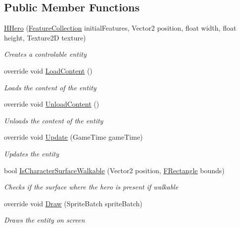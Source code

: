 \subsection*{Public Member Functions}
\begin{DoxyCompactItemize}
\item 
\hyperlink{class_hel_project_1_1_game_world_1_1_entities_1_1_h_hero_aad688c29121213e9b3790baa5f26890f}{H\+Hero} (\hyperlink{class_hel_project_1_1_features_1_1_feature_collection}{Feature\+Collection} initial\+Features, Vector2 position, float width, float height, Texture2\+D texture)
\begin{DoxyCompactList}\small\item\em Creates a controlable entity \end{DoxyCompactList}\item 
override void \hyperlink{class_hel_project_1_1_game_world_1_1_entities_1_1_h_hero_a8b69c5d3b4e7c68b2472de1d3bf76618}{Load\+Content} ()
\begin{DoxyCompactList}\small\item\em Loads the content of the entity \end{DoxyCompactList}\item 
override void \hyperlink{class_hel_project_1_1_game_world_1_1_entities_1_1_h_hero_a2e665a9cc2a0fea82c4ac7c8b1f3468b}{Unload\+Content} ()
\begin{DoxyCompactList}\small\item\em Unloads the content of the entity \end{DoxyCompactList}\item 
override void \hyperlink{class_hel_project_1_1_game_world_1_1_entities_1_1_h_hero_a421c030a8fde6fe6707b5416d0db46ff}{Update} (Game\+Time game\+Time)
\begin{DoxyCompactList}\small\item\em Updates the entity \end{DoxyCompactList}\item 
bool \hyperlink{class_hel_project_1_1_game_world_1_1_entities_1_1_h_hero_a5f4407fbb839e6f9cfa25660bca81ccc}{Is\+Character\+Surface\+Walkable} (Vector2 position, \hyperlink{class_hel_project_1_1_tools_1_1_f_rectangle}{F\+Rectangle} bounds)
\begin{DoxyCompactList}\small\item\em Checks if the surface where the hero is present if walkable \end{DoxyCompactList}\item 
override void \hyperlink{class_hel_project_1_1_game_world_1_1_entities_1_1_h_hero_a8a08422c569dbff045d597aa1663c338}{Draw} (Sprite\+Batch sprite\+Batch)
\begin{DoxyCompactList}\small\item\em Draws the entity on screen \end{DoxyCompactList}\end{DoxyCompactItemize}
